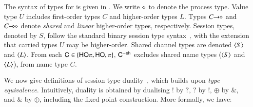 \documentclass[preprint,11pt]{elsarticle}
\begin{document}
The syntax of types for \HOp is given in . We write $\diamond$ to denote the process type.
Value type $U$ includes
  first-order types $C$ and  higher-order
types $L$.
Types $C\!\! \rightarrow\!\! \diamond$ and $C\!\! \multimap\!\! \diamond$ denote
{\em shared} and {\em linear} higher-order 
types, respectively.
Session types, denoted by $S$, follow the standard binary session type syntax~\cite{honda.vasconcelos.kubo:language-primitives}, with
the extension that carried types $U$ may be higher-order.
Shared channel types are denoted $\langle S \rangle$ and $\langle L \rangle$.
From each $\mathsf{C} \in \{\mathsf{HO}\pi, \mathsf{HO}, \pi \}$, $\mathsf{C}^{-\mathsf{sh}}$ 
excludes shared name types ($\langle S \rangle$ and $\langle L \rangle$), 
from name type $C$.

We now give definitions of session type duality~\cite{TGC14}, which builds upon \emph{type equivalence}.
Intuitively, duality is  obtained by 
dualising $!$ by $?$, $?$ by $!$, $\oplus$ by $\&$, and $\&$ by $\oplus$,  
including the fixed point construction.
More formally, we have:
\end{document}

